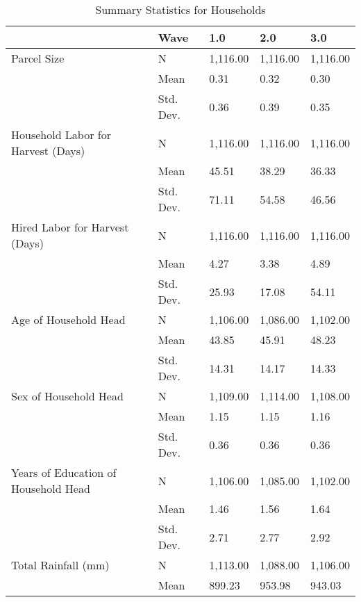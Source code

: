 \begin{table}
\centering
\caption{Summary Statistics for Households}
\label{tbl:summary}
\begin{tabular}{lllll}
\toprule
                             & Wave &       1.0 &       2.0 &       3.0 \\
\midrule
Parcel Size & N &  1,116.00 &  1,116.00 &  1,116.00 \\
                             & Mean &      0.31 &      0.32 &      0.30 \\
                             & Std. Dev. &      0.36 &      0.39 &      0.35 \\
Household Labor for Harvest (Days) & N &  1,116.00 &  1,116.00 &  1,116.00 \\
                             & Mean &     45.51 &     38.29 &     36.33 \\
                             & Std. Dev. &     71.11 &     54.58 &     46.56 \\
Hired Labor for Harvest (Days) & N &  1,116.00 &  1,116.00 &  1,116.00 \\
                             & Mean &      4.27 &      3.38 &      4.89 \\
                             & Std. Dev. &     25.93 &     17.08 &     54.11 \\
Age of Household Head & N &  1,106.00 &  1,086.00 &  1,102.00 \\
                             & Mean &     43.85 &     45.91 &     48.23 \\
                             & Std. Dev. &     14.31 &     14.17 &     14.33 \\
Sex of Household Head & N &  1,109.00 &  1,114.00 &  1,108.00 \\
                             & Mean &      1.15 &      1.15 &      1.16 \\
                             & Std. Dev. &      0.36 &      0.36 &      0.36 \\
Years of Education of Household Head & N &  1,106.00 &  1,085.00 &  1,102.00 \\
                             & Mean &      1.46 &      1.56 &      1.64 \\
                             & Std. Dev. &      2.71 &      2.77 &      2.92 \\
Total Rainfall (mm) & N &  1,113.00 &  1,088.00 &  1,106.00 \\
                             & Mean &    899.23 &    953.98 &    943.03 \\

\end{tabular}
\end{table}
